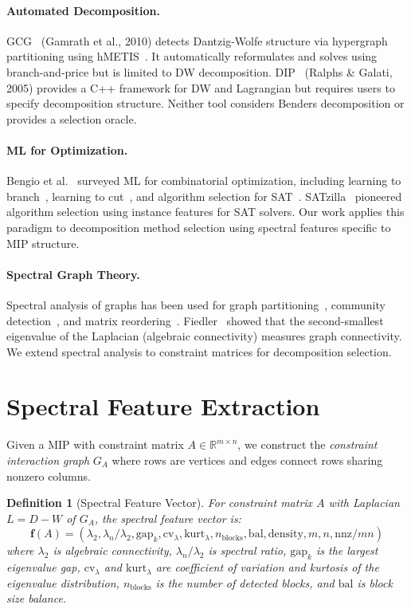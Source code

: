 \documentclass[11pt]{article}
\newtheorem{definition}[theorem]{Definition}
\begin{document}
\paragraph{Automated Decomposition.} GCG~\cite{gcg} (Gamrath et al., 2010) detects Dantzig-Wolfe structure via hypergraph partitioning using hMETIS~\cite{hmetis}. It automatically reformulates and solves using branch-and-price but is limited to DW decomposition. DIP~\cite{dip} (Ralphs \& Galati, 2005) provides a C++ framework for DW and Lagrangian but requires users to specify decomposition structure. Neither tool considers Benders decomposition or provides a selection oracle.

\paragraph{ML for Optimization.} Bengio et al.~\cite{bengio2021} surveyed ML for combinatorial optimization, including learning to branch~\cite{gasse2019}, learning to cut~\cite{tang2020}, and algorithm selection for SAT~\cite{xu2008}. SATzilla~\cite{xu2008} pioneered algorithm selection using instance features for SAT solvers. Our work applies this paradigm to decomposition method selection using spectral features specific to MIP structure.

\paragraph{Spectral Graph Theory.} Spectral analysis of graphs has been used for graph partitioning~\cite{spielman2004}, community detection~\cite{newman2006}, and matrix reordering~\cite{barnard1995}. Fiedler~\cite{fiedler1973} showed that the second-smallest eigenvalue of the Laplacian (algebraic connectivity) measures graph connectivity. We extend spectral analysis to constraint matrices for decomposition selection.

\section{Spectral Feature Extraction}
\label{sec:features}

Given a MIP with constraint matrix $A \in \mathbb{R}^{m \times n}$, we construct the \emph{constraint interaction graph} $G_A$ where rows are vertices and edges connect rows sharing nonzero columns.

\begin{definition}[Spectral Feature Vector]
For constraint matrix $A$ with Laplacian $L = D - W$ of $G_A$, the spectral feature vector is:
$$\mathbf{f}(A) = (\lambda_2, \lambda_n/\lambda_2, \text{gap}_k, \text{cv}_\lambda, \text{kurt}_\lambda, n_{\text{blocks}}, \text{bal}, \text{density}, m, n, \text{nnz}/mn)$$
where $\lambda_2$ is algebraic connectivity, $\lambda_n/\lambda_2$ is spectral ratio, $\text{gap}_k$ is the largest eigenvalue gap, $\text{cv}_\lambda$ and $\text{kurt}_\lambda$ are coefficient of variation and kurtosis of the eigenvalue distribution, $n_{\text{blocks}}$ is the number of detected blocks, and $\text{bal}$ is block size balance.
\end{definition}
\end{document}
